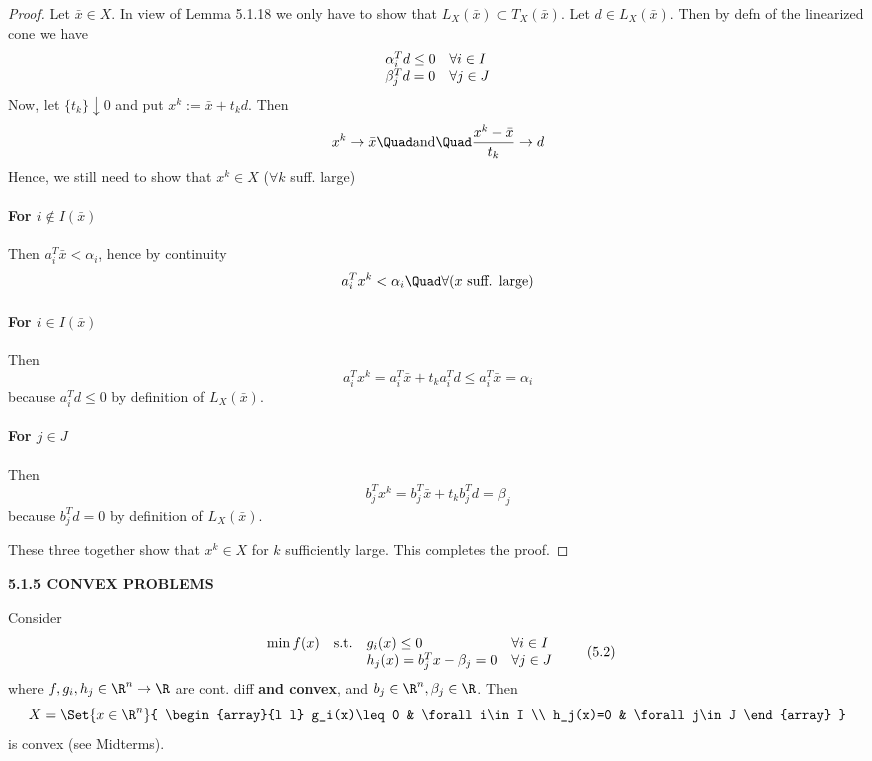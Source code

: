 \begin{proof}
	\def\LC{L_X(\bar x)}
	\def\TC{T_X(\bar x)}
	\def\Active{I(\bar x)}

	Let $\bar x\in X$. In view of Lemma 5.1.18 we only have to show that
	$\LC\subset\TC$. Let $d\in\LC$. Then by defn of the linearized cone
	we have
	$$
		\begin{array}{l l}
			\alpha_i^Td\leq0 & \forall i\in I \\
			\beta_j^Td=0     & \forall j\in J
		\end{array}
	$$
	Now, let $\{t_k\}\downarrow0$ and put $x^k:=\bar x+t_kd$. Then
	$$
		x^k\to\bar x \Quad\text{and}\Quad \frac{x^k-\bar x}{t_k}\to d
	$$
	Hence, we still need to show that $x^k\in X$ ($\forall k$ suff.
	large)

	\paragraph{For $i\notin\Active$} Then $a_i^T\bar x<\alpha_i$, hence
	by continuity
	$$
		a_i^Tx^k<\alpha_i\Quad\forall(x\text{ suff. large})
	$$

	\paragraph{For $i\in\Active$} Then
	$$
		a_i^Tx^k = a_i^T\bar x + t_ka_i^Td \leq a_i^T\bar x = \alpha_i
	$$
	because $a_i^Td\leq0$ by definition of $\LC$.

	\paragraph{For $j\in J$} Then
	$$
		b_j^T x^k=b_j^T\bar x+t_kb_j^Td=\beta_j
	$$
	because $b_j^Td=0$ by definition of $\LC$.

	These three together show that $x^k\in X$ for $k$ sufficiently
	large. This completes the proof.
\end{proof}

\textbf{5.1.5 CONVEX PROBLEMS}

Consider
\begin{equation*}
	\begin{array}{l l l l}
		\min f(x) & \text{s.t.} & g_i(x)\leq0             & \forall i\in I \\
		          &             & h_j(x)=b_j^Tx-\beta_j=0 & \forall j\in J
	\end{array}
	\tag*{(5.2)}
\end{equation*}
where $f,g_i,h_j\in\R^n\to\R$ are cont. diff \textbf{and convex}, and
$b_j\in\R^n,\beta_j\in\R$. Then
$$
	X=\Set{x\in\R^n}{
		\begin{array}{l l}
			g_i(x)\leq0 & \forall i\in I \\
			h_j(x)=0    & \forall j\in J
		\end{array}
	}
$$
is convex (see Midterms).

